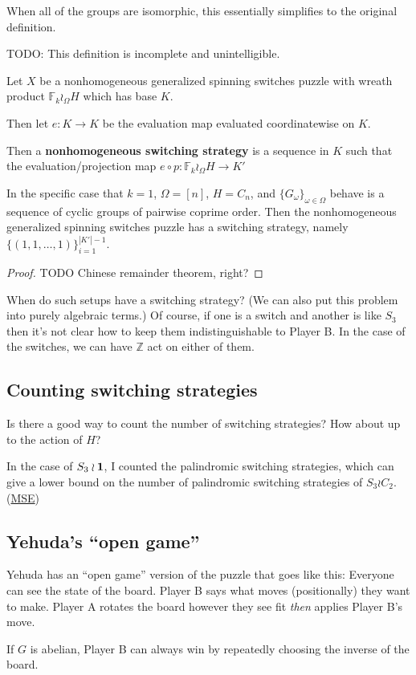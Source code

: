 When all of the groups are isomorphic, this essentially simplifies to the
original definition.

\begin{definition}
  TODO: This definition is incomplete and unintelligible.

  Let $X$ be a nonhomogeneous generalized spinning switches puzzle
  with wreath product $\mathbb F_k \wr_\Omega H$ which has base $K$.

  Then let $e\colon K \rightarrow K$ be the evaluation map evaluated
  coordinatewise on $K$.

  Then a \textbf{nonhomogeneous switching strategy} is a sequence in $K$ such
  that the evaluation/projection map
  $e \circ p \colon \mathbb F_k \wr_\Omega H \rightarrow K'$
\end{definition}

\begin{proposition}
  In the specific case that $k=1$, $\Omega = [n]$, $H = C_n$, and
  $\{G_\omega\}_{\omega \in \Omega}$ behave is a sequence of cyclic groups of
  pairwise coprime order.
  Then the nonhomogeneous generalized spinning switches puzzle has a switching
  strategy, namely $\{(1,1,\dots,1)\}_{i = 1}^{|K'| - 1}$.
\end{proposition}

\begin{proof}
  TODO
  Chinese remainder theorem, right?
\end{proof}

When do such setups have a switching strategy?
(We can also put this problem into purely algebraic terms.)
Of course, if one is a switch and another is like $S_3$ then it's not clear how
to keep them indistinguishable to Player B. In the case of the switches,
we can have $\mathbb Z$ act on either of them.

\subsection{Counting switching strategies}
Is there a good way to count the number of switching strategies?
How about up to the action of $H$?

In the case of $S_3 \wr \bf{1}$, I counted the palindromic switching
strategies, which can give a lower bound on the number of palindromic
switching strategies of $S_3 \wr C_2$.
(\href{https://math.stackexchange.com/q/3717562/121988}{MSE})

\subsection{Yehuda's ``open game''}
Yehuda has an ``open game'' version of the puzzle that goes like this:
Everyone can see the state of the board.
Player B says what moves (positionally) they want to make.
Player A rotates the board however they see fit \textit{then} applies Player
B's move.
\begin{conjecture}
  If $G$ is abelian, Player B can always win by repeatedly choosing the inverse of the board.
\end{conjecture}

